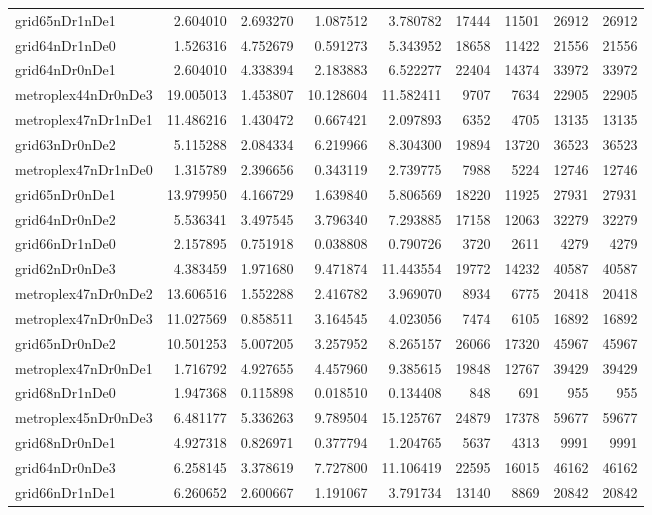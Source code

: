 \begin{longtable}{|l|r|r|r|r|r|r|r|r|}
grid65nDr1nDe1 & 2.604010 & 2.693270 & 1.087512 & 3.780782 & 17444 & 11501 & 26912 & 26912 \\
grid64nDr1nDe0 & 1.526316 & 4.752679 & 0.591273 & 5.343952 & 18658 & 11422 & 21556 & 21556 \\
grid64nDr0nDe1 & 2.604010 & 4.338394 & 2.183883 & 6.522277 & 22404 & 14374 & 33972 & 33972 \\
metroplex44nDr0nDe3 & 19.005013 & 1.453807 & 10.128604 & 11.582411 & 9707 & 7634 & 22905 & 22905 \\
metroplex47nDr1nDe1 & 11.486216 & 1.430472 & 0.667421 & 2.097893 & 6352 & 4705 & 13135 & 13135 \\
grid63nDr0nDe2 & 5.115288 & 2.084334 & 6.219966 & 8.304300 & 19894 & 13720 & 36523 & 36523 \\
metroplex47nDr1nDe0 & 1.315789 & 2.396656 & 0.343119 & 2.739775 & 7988 & 5224 & 12746 & 12746 \\
grid65nDr0nDe1 & 13.979950 & 4.166729 & 1.639840 & 5.806569 & 18220 & 11925 & 27931 & 27931 \\
grid64nDr0nDe2 & 5.536341 & 3.497545 & 3.796340 & 7.293885 & 17158 & 12063 & 32279 & 32279 \\
grid66nDr1nDe0 & 2.157895 & 0.751918 & 0.038808 & 0.790726 & 3720 & 2611 & 4279 & 4279 \\
grid62nDr0nDe3 & 4.383459 & 1.971680 & 9.471874 & 11.443554 & 19772 & 14232 & 40587 & 40587 \\
metroplex47nDr0nDe2 & 13.606516 & 1.552288 & 2.416782 & 3.969070 & 8934 & 6775 & 20418 & 20418 \\
metroplex47nDr0nDe3 & 11.027569 & 0.858511 & 3.164545 & 4.023056 & 7474 & 6105 & 16892 & 16892 \\
grid65nDr0nDe2 & 10.501253 & 5.007205 & 3.257952 & 8.265157 & 26066 & 17320 & 45967 & 45967 \\
metroplex47nDr0nDe1 & 1.716792 & 4.927655 & 4.457960 & 9.385615 & 19848 & 12767 & 39429 & 39429 \\
grid68nDr1nDe0 & 1.947368 & 0.115898 & 0.018510 & 0.134408 & 848 & 691 & 955 & 955 \\
metroplex45nDr0nDe3 & 6.481177 & 5.336263 & 9.789504 & 15.125767 & 24879 & 17378 & 59677 & 59677 \\
grid68nDr0nDe1 & 4.927318 & 0.826971 & 0.377794 & 1.204765 & 5637 & 4313 & 9991 & 9991 \\
grid64nDr0nDe3 & 6.258145 & 3.378619 & 7.727800 & 11.106419 & 22595 & 16015 & 46162 & 46162 \\
grid66nDr1nDe1 & 6.260652 & 2.600667 & 1.191067 & 3.791734 & 13140 & 8869 & 20842 & 20842 \\

\end{longtable}
